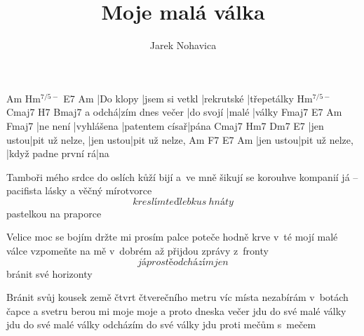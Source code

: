 \documentclass{song}
\author{Jarek Nohavica}
\title{Moje malá válka}
\newcommand{\aug}{\ensuremath{^{7/5-}}}
\begin{document}
\strophe
Am        Hm\aug{}       E7         Am
|Do klopy |jsem si vetkl |rekrutské |třepetálky
	   Hm\aug{}        Cmaj7     H7    Bmaj7
a odchá|zím dnes večer |do svojí |malé |války
Fmaj7    E7         Am             Fmaj7
|ne není |vyhlášena |patentem císař|pána
Cmaj7     Hm7            Dm7       E7
|jen ustou|pit už nelze, |jen ustou|pit už nelze,
Am        F7             E7                  Am
|jen ustou|pit už nelze, |když padne první rá|na
\endstrophe

\strophe*
Tamboři mého srdce do oslích kůží bijí
a~ve mně šikují se korouhve kompanií
já -- pacifista lásky a věčný mírotvorce
\[ kreslím teď lebku s~hnáty \] pastelkou na praporce
\endstrophe

\strophe*
Velice moc se bojím držte mi prosím palce
poteče hodně krve v~té mojí malé válce
vzpomeňte na mě v~dobrém až přijdou zprávy z~fronty
\[ já prostě odcházím jen \] bránit své horizonty
\endstrophe

\strophe*
Bránit svůj kousek země čtvrt čtverečního metru
víc místa nezabírám v~botách čapce a svetru
berou mi moje moje a proto dneska večer
jdu do své malé války jdu do své malé války
odcházím do své války jdu proti mečům s~mečem
\endstrophe

\end{document}
